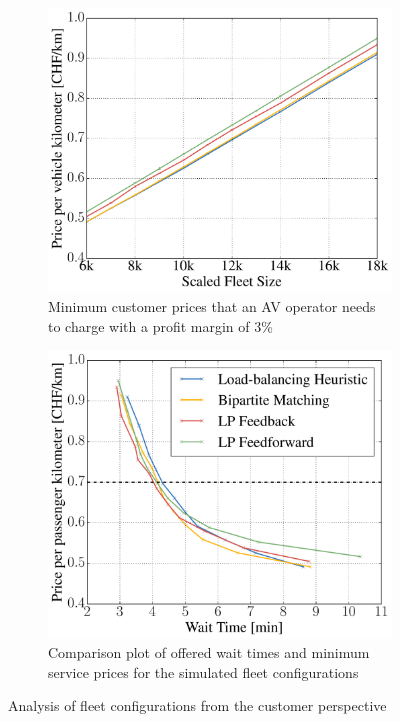 \begin{figure}
    \centering
    \begin{subfigure}[t]{0.495\textwidth}
        \includegraphics[width=1.0\textwidth]{figures/01_passenger_price.pdf}
        \caption{Minimum customer prices that an AV operator needs to charge with a profit margin of 3\%}
        \label{fig:passenger_price}
    \end{subfigure}\hfill
    \begin{subfigure}[t]{0.495\textwidth}
        \includegraphics[width=1.0\textwidth]{figures/time_vs_price.pdf}
        \caption{Comparison plot of offered wait times and minimum service prices for the
        simulated fleet configurations}
        \label{fig:time_vs_price}
    \end{subfigure}
    \caption{Analysis of fleet configurations from the customer perspective}
\end{figure}

